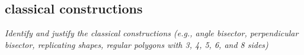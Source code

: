 \subsection{classical constructions}

\textit{Identify and justify the classical constructions (e.g., angle bisector, perpendicular bisector,
replicating shapes, regular polygons with 3, 4, 5, 6, and 8 sides)}
